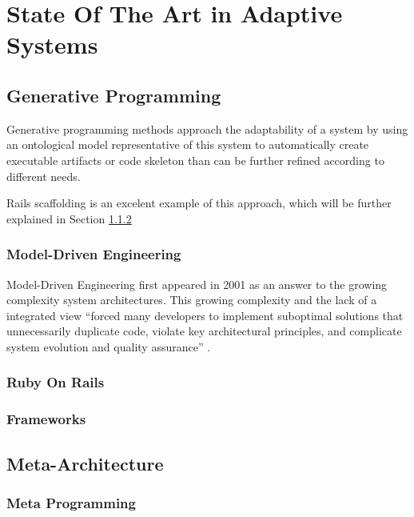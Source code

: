\chapter{State Of The Art in Adaptive Systems}\label{chap:sota}

\section{Generative Programming}\label{sec:generative_programming}

Generative programming methods approach the adaptability of a system by using an ontological model representative of this system to automatically create executable artifacts or code skeleton than can be further refined according to different needs.

Rails scaffolding is an excelent example of this approach, which will be further explained in Section \ref{sec:ror}

\subsection{Model-Driven Engineering}\label{sec:mda}

Model-Driven Engineering first appeared in 2001 \cite{mda_omg} as an answer to the growing complexity system architectures. This growing complexity and the lack of a integrated view ``forced many developers to implement suboptimal solutions that unnecessarily duplicate code, violate key architectural principles, and complicate system evolution and quality assurance'' \cite{Sch06}.

\subsection{Ruby On Rails}\label{sec:ror}

\subsection{Frameworks}\label{sec:frameworks}


\section{Meta-Architecture}\label{sec:meta-architecture}

\subsection{Meta Programming}\label{sec:metaprogramming}

